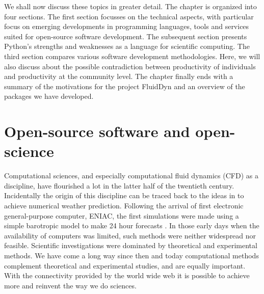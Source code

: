 We shall now discuss these topics in greater detail. The chapter is organized
into four sections. The first section focusses on the technical aspects, with
particular focus on emerging developments in programming languages, tools and
services suited for open-source software development. The subsequent section
presents Python's strengths and weaknesses as a language for scientific
computing.
%
The third section compares various software development methodologies. Here, we
will also discuss about the possible contradiction between productivity of
individuals and productivity at the community level.
%
The chapter finally ends with a summary of the motivations for the project
FluidDyn and an overview of the packages we have developed.
%

\section{Open-source software and open-science}

Computational sciences, and especially computational fluid dynamics (CFD) as a
discipline, have flourished a lot in the latter half of the twentieth century.
Incidentally the origin of this discipline can be traced back to the ideas in
\citet{richardson_weather_1922} to achieve numerical weather prediction.
Following the arrival of first electronic general-purpose computer, ENIAC, the
first simulations were made using a simple barotropic model to make 24 hour
forecasts \citep{lynch_richardson_2010}. In those early days when the
availability of computers was limited, such methods were neither widespread nor
feasible. Scientific investigations were dominated by theoretical and
experimental methods.
%
We have come a long way since then and today computational methods complement
theoretical and experimental studies, and are equally important.
%
%
With the connectivity provided by the world wide web it is possible to achieve
more and reinvent the way we do sciences.

